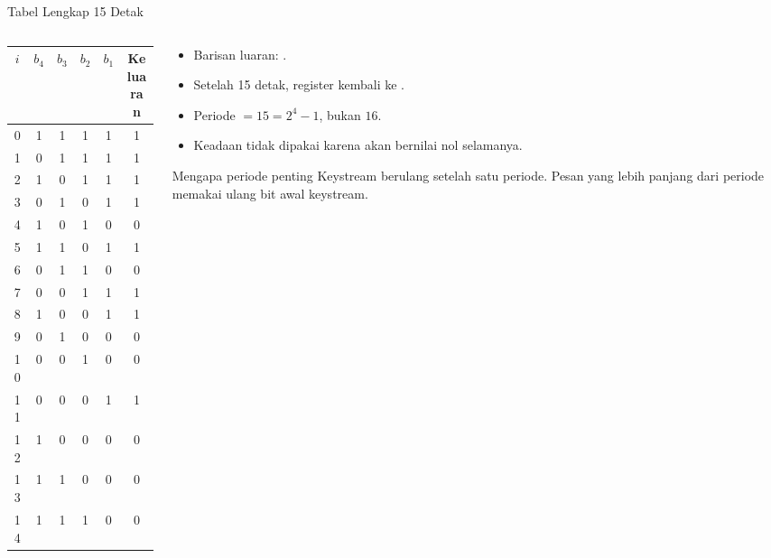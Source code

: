 \documentclass[aspectratio=169,11pt]{beamer}
\begin{document}
\begin{frame}{Tabel Lengkap 15 Detak}
    \footnotesize
    \begin{columns}[T,onlytextwidth]
        \begin{column}{0.44\textwidth}
            \centering
            \scriptsize
            \begin{tabular}{@{}cccccc@{}}
                \toprule
                $i$ & $b_4$ & $b_3$ & $b_2$ & $b_1$ & Keluaran \\
                \midrule
                0  & 1 & 1 & 1 & 1 & 1 \\
                1  & 0 & 1 & 1 & 1 & 1 \\
                2  & 1 & 0 & 1 & 1 & 1 \\
                3  & 0 & 1 & 0 & 1 & 1 \\
                4  & 1 & 0 & 1 & 0 & 0 \\
                5  & 1 & 1 & 0 & 1 & 1 \\
                6  & 0 & 1 & 1 & 0 & 0 \\
                7  & 0 & 0 & 1 & 1 & 1 \\
                8  & 1 & 0 & 0 & 1 & 1 \\
                9  & 0 & 1 & 0 & 0 & 0 \\
                10 & 0 & 0 & 1 & 0 & 0 \\
                11 & 0 & 0 & 0 & 1 & 1 \\
                12 & 1 & 0 & 0 & 0 & 0 \\
                13 & 1 & 1 & 0 & 0 & 0 \\
                14 & 1 & 1 & 1 & 0 & 0 \\
                \bottomrule
            \end{tabular}
        \end{column}
        \begin{column}{0.52\textwidth}
            \begin{itemize}
                \item Barisan luaran:
                      .
                \item Setelah 15 detak, register kembali ke .
                \item Periode $=15=2^4-1$, bukan $16$.
                \item Keadaan  tidak dipakai karena akan bernilai
                      nol selamanya.
            \end{itemize}
            \begin{block}{Mengapa periode penting}
                Keystream berulang setelah satu periode. Pesan yang lebih
                panjang dari periode memakai ulang bit awal keystream.
            \end{block}
        \end{column}
    \end{columns}
\end{frame}
\end{document}
